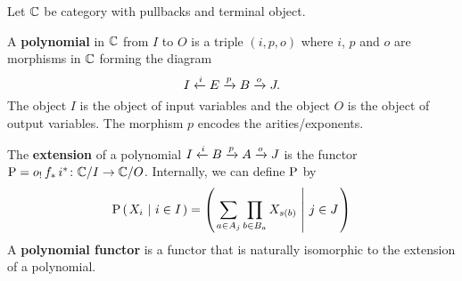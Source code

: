 Let $\catC$ be category with pullbacks and terminal object.

\begin{definition}\label{defn:Polynomial}
   \leanok
  A \textbf{polynomial} in $\catC$ from $I$ to $O$ is a triple $(i,p,o)$ where
  $i$, $p$ and $o$ are morphisms in $\catC$ forming the diagram
  $$\polyspan IEBJipo.$$
  The object $I$ is the object of input variables and the object $O$ is the object of output
  variables. The morphism $p$ encodes the arities/exponents.
  \end{definition}


\begin{definition}
  \label{defn:extension}
   \leanok
  The \textbf{extension} of a polynomial $\polyspan IBAJipo$ is the functor
  $\upP = o_! \, f_* \, i^* \colon \catC / I \to \catC/ O$. Internally, we can define $\upP$ by
  $$\upP \seqbn{X_i}{i \in I} = \seqbn{\sum_{a \in A_j} \prod_{b \in B_a} X_{s(b)}}{j \in J}$$
  A \textbf{polynomial functor} is a functor that is naturally isomorphic to the extension of a polynomial.
  \end{definition}
